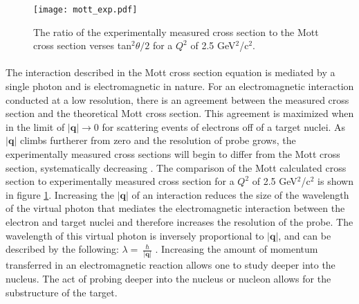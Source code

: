 \begin{figure}[]
	\centering
	\textbf{ }\par\medskip
	\texttt{[image: mott\_exp.pdf]}
	\caption{The ratio of the experimentally measured cross section to the Mott cross section verses tan$^2\theta/2$ for a $Q^2$ of 2.5 GeV$^2$/c$^2$. \cite{EPinter}}
	\label{mott_exp}
\end{figure}

\paragraph{}The interaction described in the Mott cross section equation is mediated by a single photon and is electromagnetic in nature. For an electromagnetic interaction conducted at a low resolution, there is an agreement between the measured cross section and the theoretical Mott cross section. This agreement is maximized when in the limit of $|\boldsymbol{q}| \rightarrow  0$ for scattering events of electrons off of a target nuclei. As $|\boldsymbol{q}|$ climbs furtherer from zero and the resolution of probe grows, the experimentally measured cross sections will begin to differ from the Mott cross section, systematically decreasing \cite{PnN}. The comparison of the Mott calculated cross section to experimentally measured cross section for a $Q^2$ of 2.5 GeV$^2$/c$^2$ is shown in figure \ref{mott_exp}. Increasing the $|\boldsymbol{q}|$ of an interaction reduces the size of the wavelength of the virtual photon that mediates the electromagnetic interaction between the electron and target nuclei and therefore increases the resolution of the probe. The wavelength of this virtual photon is inversely proportional to $|\boldsymbol{q}|$, and can be described by the following: $\lambda = \ \frac{\hbar}{|\boldsymbol{q}|}$ \cite{PnN}. Increasing the amount of momentum transferred in an electromagnetic reaction allows one to study deeper into the nucleus. The act of probing deeper into the nucleus or nucleon allows for the substructure of the target. 
